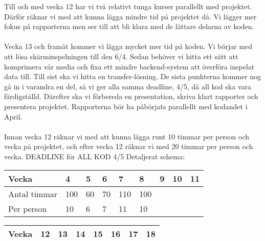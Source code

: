 \documentclass[a4paper,10pt]{article}
\begin{document}
Till och med vecka 12 har vi två relativt tunga kurser parallellt med projektet. Därför räknar vi med att kunna lägga mindre tid på projektet då. Vi lägger mer fokus på rapporterna men ser till att bli klara med de lättare delarna av koden. 
\\\\
Vecka 13 och framåt kommer vi lägga mycket mer tid på koden. Vi börjar med att lösa skärminspelningen till den 6/4. Sedan behöver vi hitta ett sätt att komprimera vår media och fixa ett mindre backend-system att överföra inspelat data till. Till sist ska vi hitta en transfer-lösning. De sista punkterna kommer nog gå in i varandra en del, så vi ger alla samma deadline, 4/5, då all kod ska vara färdigställd. 
Därefter ska vi förbereda en presentation, skriva klart rapporter och presentera projektet. Rapporterna bör ha påbörjats parallellt med kodandet i April.
\\\\
Innan vecka 12 räknar vi med att kunna lägga runt 10 timmar per person och vecka på projektet, och efter vecka 12 räknar vi med 20 timmar per person och vecka.
DEADLINE för ALL KOD 4/5
Detaljerat schema: 

\begin{center}
    \begin{tabular}{ | l | l | l | l | l | l | l | l | l |}
    \hline
    Vecka & 4 & 5 & 6 & 7 & 8 & 9 & 10 & 11  \\ \hline
    Antal timmar & 100 & 60 & 70 & 110 & 100 &  &  &   \\ \hline
    Per person & 10 & 6 & 7 & 11 & 10 &  &  &   \\ \hline
    \end{tabular}
\end{center}

\begin{center}
    \begin{tabular}{ | l | l | l | l | l | l | l | l |}
    \hline
    Vecka & 12 & 13 & 14 & 15 & 16 & 17 & 18  \\ \hline
    \end{tabular}
\end{center}
\end{document}
